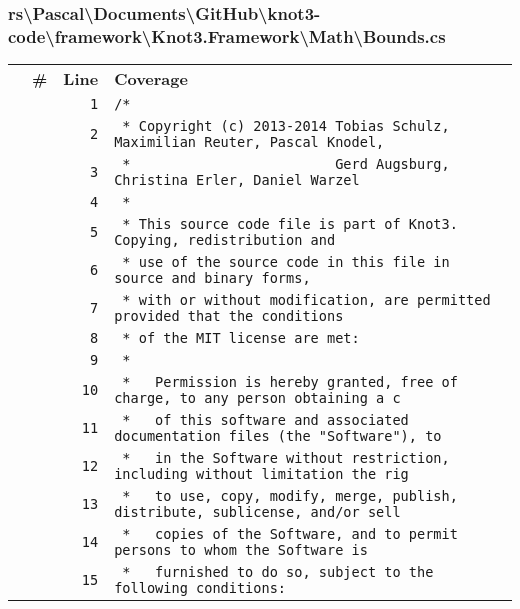 \documentclass[a4paper,10pt]{article}
\begin{document}
\subsubsection{rs\textbackslash Pascal\textbackslash Documents\textbackslash GitHub\textbackslash knot3-code\textbackslash framework\textbackslash Knot3.Framework\textbackslash Math\textbackslash Bounds.cs}
\begin{longtable}[l]{lrrl}
\textbf{} & \textbf{\#} & \textbf{Line} & \textbf{Coverage}\\
\cellcolor{gray} &  & \verb~1~ & \verb~/*~\\
\cellcolor{gray} &  & \verb~2~ & \verb~ * Copyright (c) 2013-2014 Tobias Schulz, Maximilian Reuter, Pascal Knodel,~\\
\cellcolor{gray} &  & \verb~3~ & \verb~ *                         Gerd Augsburg, Christina Erler, Daniel Warzel~\\
\cellcolor{gray} &  & \verb~4~ & \verb~ *~\\
\cellcolor{gray} &  & \verb~5~ & \verb~ * This source code file is part of Knot3. Copying, redistribution and~\\
\cellcolor{gray} &  & \verb~6~ & \verb~ * use of the source code in this file in source and binary forms,~\\
\cellcolor{gray} &  & \verb~7~ & \verb~ * with or without modification, are permitted provided that the conditions~\\
\cellcolor{gray} &  & \verb~8~ & \verb~ * of the MIT license are met:~\\
\cellcolor{gray} &  & \verb~9~ & \verb~ *~\\
\cellcolor{gray} &  & \verb~10~ & \verb~ *   Permission is hereby granted, free of charge, to any person obtaining a c~\\
\cellcolor{gray} &  & \verb~11~ & \verb~ *   of this software and associated documentation files (the "Software"), to ~\\
\cellcolor{gray} &  & \verb~12~ & \verb~ *   in the Software without restriction, including without limitation the rig~\\
\cellcolor{gray} &  & \verb~13~ & \verb~ *   to use, copy, modify, merge, publish, distribute, sublicense, and/or sell~\\
\cellcolor{gray} &  & \verb~14~ & \verb~ *   copies of the Software, and to permit persons to whom the Software is~\\
\cellcolor{gray} &  & \verb~15~ & \verb~ *   furnished to do so, subject to the following conditions:~\\

\end{longtable}
\end{document}
